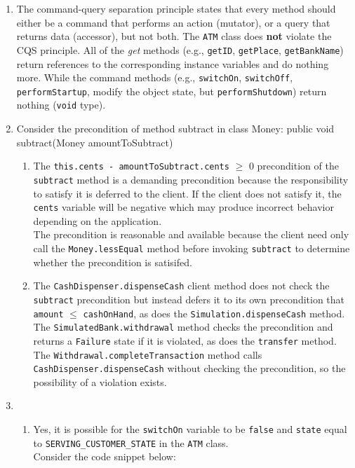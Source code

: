 \documentclass{report}
\begin{document}
\begin{enumerate}
	\item The command-query separation principle states that every method should either be a command that performs an action
	(mutator), or a query that returns data (accessor), but not both. The \texttt{ATM} class does \textbf{not} violate the CQS principle.
	All of the \textit{get} methods (e.g., \texttt{getID},
	\texttt{getPlace}, \texttt{getBankName}) return references to the
	corresponding instance variables and do nothing more. While the
    command	methods (e.g., \texttt{switchOn}, \texttt{switchOff},
	\texttt{performStartup}, modify the object state, but \texttt{performShutdown}) return nothing (\texttt{void} type).
		
	\item Consider the precondition of method subtract in class Money:
	public void subtract(Money amountToSubtract)
	\begin{enumerate}
	    \item The \texttt{this.cents - amountToSubtract.cents} $\geq$ 0 precondition of the \texttt{subtract} method
	    is a demanding precondition because the responsibility
	    to satisfy it is deferred to the client. If the client
	    does not satisfy it, the \texttt{cents} variable will
	    be negative which may produce incorrect behavior
	    depending on the application.\\
	    The precondition is reasonable and available because
	    the client need only call the \texttt{Money.lessEqual}
	    method before invoking \texttt{subtract} to determine
	    whether the precondition is satisifed.
	    
	    \item The \texttt{CashDispenser.dispenseCash} client
	    method does not check the \texttt{subtract} precondition
	    but instead defers it to its own precondition that
	    \texttt{amount} $\leq$ \texttt{cashOnHand}, as does
	    the \texttt{Simulation.dispenseCash} method. The
	    \texttt{SimulatedBank.withdrawal} method checks the
	    precondition and returns a \texttt{Failure} state if
	    it is violated, as does the \texttt{transfer} method.
	    The \texttt{Withdrawal.completeTransaction} method calls
	    \texttt{CashDispenser.dispenseCash} without checking
	    the precondition, so the possibility of a violation
	    exists.
	\end{enumerate}
	
	\item 
	\begin{enumerate}
		\item Yes, it is possible for the \texttt{switchOn} variable to be
		\texttt{false} and \texttt{state} equal to
		\texttt{SERVING\_CUSTOMER\_STATE} in the \texttt{ATM} class. \\
		Consider the code snippet below:
				

\end{enumerate}
\end{enumerate}
\end{document}
